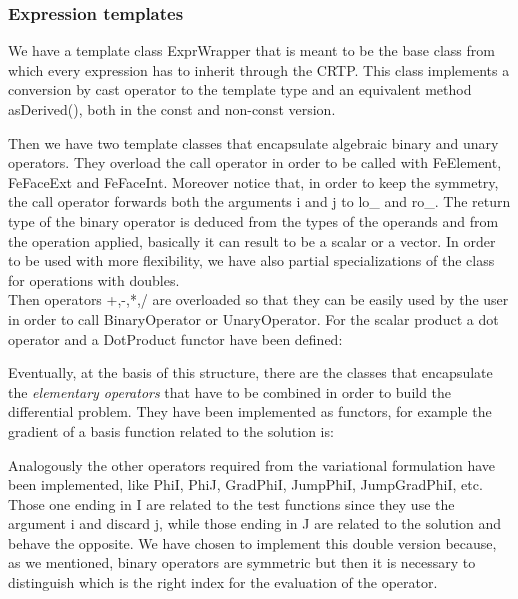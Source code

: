 \documentclass[12pt, a4paper]{article}
\newcommand{\code}[1]{{\footnotesize\ttfamily #1}}
\theoremstyle{definition}
\theoremstyle{plain}
\theoremstyle{plain}
\theoremstyle{definition}
\begin{document}
\subsubsection{Expression templates}

We have a template class \code{ExprWrapper} that is meant to be the base class from which every expression has to inherit through the CRTP. This class implements a conversion by cast operator to the template type and an equivalent method \code{asDerived()}, both in the \code{const} and non-\code{const} version.

Then we have two template classes that encapsulate algebraic binary and unary operators. They overload the call operator in order to be called with \code{FeElement}, \code{FeFaceExt} and \code{FeFaceInt}. Moreover notice that, in order to keep the symmetry, the call operator forwards both the arguments \code{i} and \code{j} to \code{lo\_} and \code{ro\_}. The return type of the binary operator is deduced from the types of the operands and from the operation applied, basically it can result to be a scalar or a vector. In order to be used with more flexibility, we have also partial specializations of the class for operations with \code{double}s.\\
Then operators \code{+,-,*,/} are overloaded so that they can be easily used by the user in order to call \code{BinaryOperator} or \code{UnaryOperator}. For the scalar product a \code{dot} operator and a \code{DotProduct} functor have been defined:

Eventually, at the basis of this structure, there are the classes that encapsulate the \emph{elementary operators} that have to be combined in order to build the differential problem. They have been implemented as functors, for example the gradient of a basis function related to the solution is:

Analogously the other operators required from the variational formulation have been implemented, like \code{PhiI, PhiJ, GradPhiI, JumpPhiI, JumpGradPhiI}, etc. Those one ending in \code{I} are related to the test functions since they use the argument \code{i} and discard \code{j}, while those ending in \code{J} are related to the solution and behave the opposite. We have chosen to implement this double version because, as we mentioned, binary operators are symmetric but then it is necessary to distinguish which is the right index for the evaluation of the operator.\\
\end{document}
